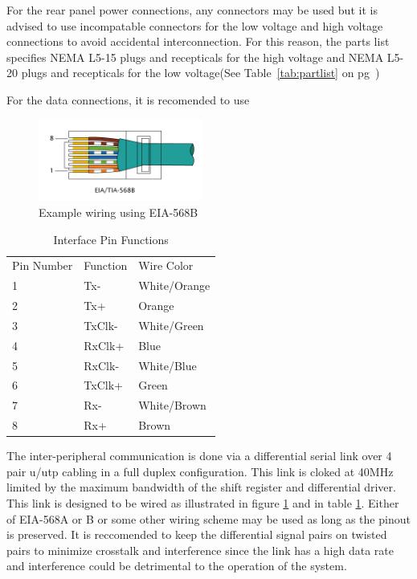 \documentclass{book}
\begin{document}
For the rear panel power connections, any connectors may be used but it is advised to use incompatable connectors for the low voltage and high voltage connections to avoid accidental interconnection. For this reason, the parts list specifies NEMA L5-15 plugs and recepticals for the high voltage and NEMA L5-20 plugs and recepticals for the low voltage(See Table~\ref{tab:partlist} on pg~\pageref{tab:partlist})

For the data connections, it is recomended to use 

\begin{figure}
  \begin{center}
    \includegraphics[width=0.48\textwidth]{RJ-45_TIA-568B_Left.png}
  \end{center}
  \caption{Example wiring using EIA-568B\cite{img:eia568}\label{fig:eia568}}
\end{figure}

\begin{table}
\centering
\begin{tabular}{| l | l | l |}
Pin Number & Function & Wire Color\\
1 & Tx- & White/Orange\\
2 & Tx+ & Orange\\
3 & TxClk- & White/Green\\
4 & RxClk+ & Blue\\
5 & RxClk- & White/Blue\\
6 & TxClk+ & Green\\
7 & Rx- & White/Brown\\
8 & Rx+ & Brown\\
\end{tabular}
\caption{Interface Pin Functions\label{tab:intpin}}
\end{table}
The inter-peripheral communication is done via a differential serial link over 4 pair u/utp cabling in a full duplex configuration. This link is cloked at 40MHz limited by the maximum bandwidth of the shift register and differential driver. This link is designed to be wired as illustrated in figure \ref{fig:eia568} and in table \ref{tab:intpin}. Either of EIA-568A or B or some other wiring scheme may be used as long as the pinout is preserved. It is reccomended to keep the differential signal pairs on twisted pairs to minimize crosstalk and interference since the link has a high data rate and interference could be detrimental to the operation of the system.
\end{document}
